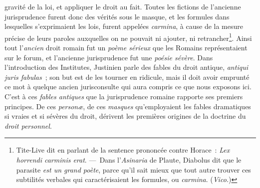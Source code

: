 \documentclass[french,twoside]{book} %
\begin{document}
gravité de la loi, et appliquer le droit au fait. Toutes les fictions de l’ancienne jurisprudence furent donc des vérités sous le masque, et les formules dans lesquelles s’exprimaient les lois, furent appelées {\itshape carmina}, à cause de la mesure précise de leurs paroles auxquelles on ne pouvait ni ajouter, ni retrancher\footnote{Tite-Live dit en parlant de la sentence prononcée contre Horace : \emph{{\itshape Lex horrendi carminis erat}}. — Dans l’{\itshape Asinaria} de Plaute, Diabolus dit que le parasite \emph{{\itshape est un grand poète}}, parce qu’il sait mieux que tout autre trouver ces subtilités verbales qui caractérisaient les formules, ou {\itshape carmina}. ({\itshape Vico.})}. Ainsi tout l’{\itshape ancien} droit romain fut un {\itshape poème sérieux} que les Romains représentaient sur le forum, et l’ancienne jurisprudence fut une {\itshape poésie sévère}. Dans l’introduction  des Institutes, Justinien parle des fables du droit antique, \emph{{\itshape antiqui juris fabulas}} ; son but est de les tourner en ridicule, mais il doit avoir emprunté ce mot à quelque ancien jurisconsulte qui aura compris ce que nous exposons ici. C’est à ces {\itshape fables antiques} que la jurisprudence romaine rapporte ses premiers principes. De ces {\itshape personæ}, de ces {\itshape masques} qu’employaient les fables dramatiques si vraies et si sévères du droit, dérivent les premières origines de la doctrine du {\itshape droit personnel}.\par
\end{document}
